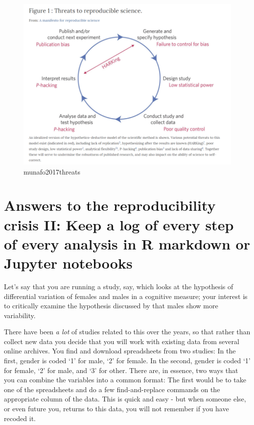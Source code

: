 \documentclass[
  openany]{book}
\begin{document}
\begin{figure}
\centering
\includegraphics{munafo2017threats.PNG}
\caption{munafo2017threats}
\end{figure}

\hypertarget{answers-to-the-reproducibility-crisis-ii-keep-a-log-of-every-step-of-every-analysis-in-r-markdown-or-jupyter-notebooks}{%
\section{Answers to the reproducibility crisis II: Keep a log of every step of every analysis in R markdown or Jupyter notebooks}\label{answers-to-the-reproducibility-crisis-ii-keep-a-log-of-every-step-of-every-analysis-in-r-markdown-or-jupyter-notebooks}}

Let's say that you are running a study, say, which looks at the hypothesis of differential variation of females and males in a cognitive measure; your interest is to critically examine the hypothesis discussed by \citet{wainer2007dangerous} that males show more variability.

There have been \emph{a lot} of studies related to this over the years, so that rather than collect new data you decide that you will work with existing data from several online archives. You find and download spreadsheets from two studies: In the first, gender is coded `1' for male, `2' for female. In the second, gender is coded `1' for female, `2' for male, and `3' for other. There are, in essence, two ways that you can combine the variables into a common format: The first would be to take one of the spreadsheets and do a few find-and-replace commands on the appropriate column of the data. This is quick and easy - but when someone else, or even future you, returns to this data, you will not remember if you have recoded it.
\end{document}
